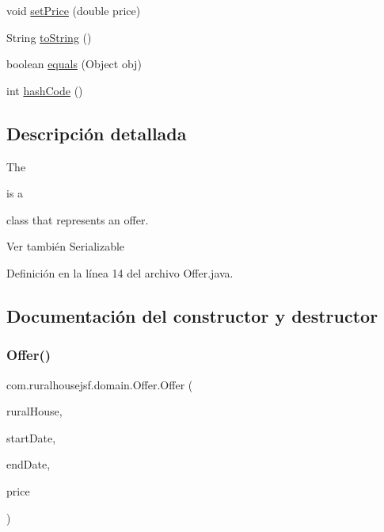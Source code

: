 \begin{DoxyCompactItemize}
\item 
void \mbox{\hyperlink{classcom_1_1ruralhousejsf_1_1domain_1_1_offer_aaf77b7df1299a14ecc9cae2040dec6af}{set\+Price}} (double price)
\item 
String \mbox{\hyperlink{classcom_1_1ruralhousejsf_1_1domain_1_1_offer_a91920170708c786730b8707d51d5a810}{to\+String}} ()
\item 
boolean \mbox{\hyperlink{classcom_1_1ruralhousejsf_1_1domain_1_1_offer_aea11cafbf3e7304d38630b80a3f4dc1e}{equals}} (Object obj)
\item 
int \mbox{\hyperlink{classcom_1_1ruralhousejsf_1_1domain_1_1_offer_aad4fd5441e084e41b30bb1d8d3597c48}{hash\+Code}} ()
\end{DoxyCompactItemize}


\subsection{Descripción detallada}
The
\begin{DoxyCode}{0}
\end{DoxyCode}
 is a
\begin{DoxyCode}{0}
\end{DoxyCode}
 class that represents an offer.

\begin{DoxySeeAlso}{Ver también}
Serializable 
\end{DoxySeeAlso}


Definición en la línea 14 del archivo Offer.\+java.



\subsection{Documentación del constructor y destructor}
\mbox{\label{classcom_1_1ruralhousejsf_1_1domain_1_1_offer_ac2559262a3321b69ab5abb4ae28ade81}} 
\subsubsection{\texorpdfstring{Offer()}{Offer()}\hspace{0.1cm}{\footnotesize\ttfamily [1/2]}}
{\footnotesize\ttfamily com.\+ruralhousejsf.\+domain.\+Offer.\+Offer (\begin{DoxyParamCaption}\item[{\mbox{\hyperlink{classcom_1_1ruralhousejsf_1_1domain_1_1_rural_house}{Rural\+House}}}]{rural\+House,  }\item[{Local\+Date}]{start\+Date,  }\item[{Local\+Date}]{end\+Date,  }\item[{double}]{price }\end{DoxyParamCaption})}

